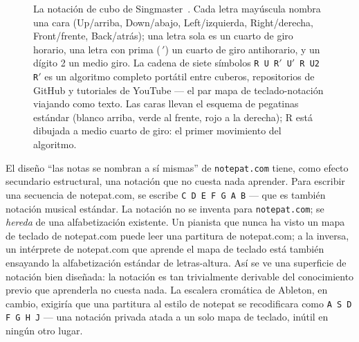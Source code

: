 \documentclass[10pt,letterpaper,twocolumn]{article}
\begin{document}
\begin{figure}[t]
{\begin{tikzpicture}
\end{tikzpicture}}
\caption{La notación de cubo de Singmaster~\citep{singmaster1981notes}. Cada letra mayúscula nombra una cara (\textsf{U}p/arriba, \textsf{D}own/abajo, \textsf{L}eft/izquierda, \textsf{R}ight/derecha, \textsf{F}ront/frente, \textsf{B}ack/atrás); una letra sola es un cuarto de giro horario, una letra con prima ($\,'$) un cuarto de giro antihorario, y un dígito 2 un medio giro. La cadena de siete símbolos \texttt{R U R$'$ U$'$ R U2 R$'$} es un algoritmo completo portátil entre cuberos, repositorios de GitHub y tutoriales de YouTube --- el par mapa de teclado-notación viajando como texto. Las caras llevan el esquema de pegatinas estándar (blanco arriba, verde al frente, rojo a la derecha); \textsf{R} está dibujada a medio cuarto de giro: el primer movimiento del algoritmo.}
\label{fig:singmaster}
\end{figure}

El diseño ``las notas se nombran a sí mismas'' de \texttt{notepat.com} tiene, como efecto secundario estructural, una notación que no cuesta nada aprender. Para escribir una secuencia de notepat.com, se escribe \texttt{C D E F G A B} --- que es también notación musical estándar. La notación no se inventa para \texttt{notepat.com}; se \emph{hereda} de una alfabetización existente. Un pianista que nunca ha visto un mapa de teclado de notepat.com puede leer una partitura de notepat.com; a la inversa, un intérprete de notepat.com que aprende el mapa de teclado está también ensayando la alfabetización estándar de letras-altura. Así se ve una superficie de notación bien diseñada: la notación es tan trivialmente derivable del conocimiento previo que aprenderla no cuesta nada. La escalera cromática de Ableton, en cambio, exigiría que una partitura al estilo de notepat se recodificara como \texttt{A S D F G H J} --- una notación privada atada a un solo mapa de teclado, inútil en ningún otro lugar.
\end{document}
